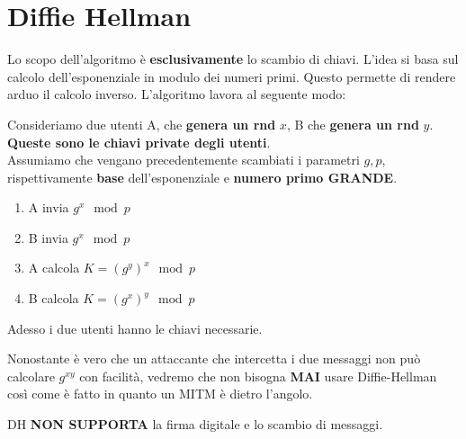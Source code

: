 \section{Diffie Hellman}
Lo scopo dell'algoritmo è \textbf{esclusivamente} lo scambio di chiavi. L'idea si basa sul calcolo dell'esponenziale in modulo dei numeri primi. Questo permette di rendere arduo il calcolo inverso. L'algoritmo lavora al seguente modo:
\begin{definition}\label{def:dh}
Consideriamo due utenti A, che \textbf{genera un rnd} $x$, B che \textbf{genera un rnd} $y$. \textbf{Queste sono le chiavi private degli utenti}.\\
Assumiamo che vengano precedentemente scambiati i parametri $g,p$, rispettivamente \textbf{base} dell'esponenziale e \textbf{numero primo GRANDE}.
\begin{enumerate}
    \item A invia $g^x\mod{p}$
    \item B invia $g^x\mod{p}$
    \item A calcola $K=(g^y)^x\mod{p}$
    \item B calcola $K=(g^x)^y\mod{p}$
\end{enumerate}
Adesso i due utenti hanno le chiavi necessarie.
\end{definition}
\begin{remark}Nonostante è vero che un attaccante che intercetta i due messaggi non può calcolare $g^{xy}$ con facilità, vedremo che non bisogna \textbf{MAI} usare Diffie-Hellman così come è fatto in quanto un MITM è dietro l'angolo. 
\end{remark}
\begin{remark}
DH \textbf{NON SUPPORTA} la firma digitale e lo scambio di messaggi.
\end{remark}
